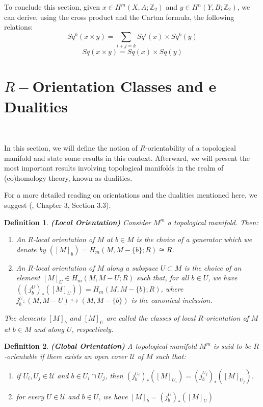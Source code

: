 \documentclass[12pt,oneside]{book}
\newtheorem{defi}   {Definition}[chapter]
\newcommand{\ds}{\displaystyle}
\newcommand{\Z}{\mathbb{Z}}
\begin{document}
    To conclude this section, given $x\in H^{m}(X,A;\Z_{2})$ and $y\in H^{n}(Y,B;\Z_{2})$, we can derive, using the cross 
    product and the Cartan formula, the following relations:
    $$ Sq^{k}(x\times y)=\ds\sum_{i+j=k}Sq^{i}(x)\times Sq^{k}(y) $$ 
    $$ Sq(x\times y)=Sq(x)\times Sq(y) $$
    
    

    \section{$R-$Orientation Classes and e Dualities}\label{ap_orient}

    \

    In this section, we will define the notion of $R$-orientability of a topological manifold and state some 
    results in this context. Afterward, we will present the most important results involving topological manifolds in the realm of 
    (co)homology theory, known as dualities.

    For a more detailed reading on orientations and the dualities mentioned here, we suggest (\cite{hatcher}, Chapter 3, Section 3.3).
    
    \begin{defi}{\bf (Local Orientation)}
        Consider $M^{m}$ a topological manifold. Then:
        \begin{enumerate}
            \item An $R$-local orientation of $M$ at $b \in M$ is the choice of a generator which we denote by 
            $([M]_{b}) = H_{m}(M, M-\{b\}; R) \cong R$.
            \item An $R$-local orientation of $M$ along a subspace $U \subset M$ is the choice of an element $[M]_{U} \in H_{m}(M, M-U; R)$ 
            such that, for all $b \in U$, we have $((j_{b}^{U})_{*}([M]_{U})) = H_{m}(M, M-\{b\}; R)$, where 
            $j_{b}^{U}:(M, M-U) \hookrightarrow (M, M-\{b\})$ is the canonical inclusion.
        \end{enumerate}
        
        The elements $[M]_{b}$ and $[M]_{U}$ are called the classes of local $R$-orientation of $M$ at 
        $b \in M$ and along $U$, respectively.
    \end{defi}
    
    \begin{defi}{\bf (Global Orientation)}
        A topological manifold $M^{m}$ is said to be $R$-orientable if there exists an open cover $\mathcal{U}$ of $M$ such that:
        \begin{enumerate}
            \item if $U_{i}, U_{j} \in \mathcal{U}$ and $b \in U_{i} \cap U_{j}$, then 
            $(j_{b}^{U_{i}})_{*}([M]_{U_{i}}) = (j_{b}^{U_{j}})_{*}([M]_{U_{j}})$.
            \item for every $U \in \mathcal{U}$ and $b \in U$, we have $[M]_{b} = (j_{b}^{U})_{*}([M]_{U})$
        \end{enumerate}
    \end{defi}
    
\end{document}
